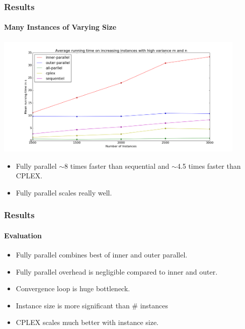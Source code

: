 \documentclass{beamer}
\begin{document}
\begin{frame}[fragile]
\frametitle{Results}
\framesubtitle{Many Instances of Varying Size}
\centering
\includegraphics[width=0.9\textwidth]{../Doc/figures/many-varying}
\begin{itemize}
	\item Fully parallel $\sim$8 times faster than sequential and $\sim$4.5 times faster than CPLEX.
	\item Fully parallel scales really well.
\end{itemize}
\end{frame}

\begin{frame}
\frametitle{Results}
\framesubtitle{Evaluation}
\begin{itemize}
\item Fully parallel combines best of inner and outer parallel.
\pause
\item Fully parallel overhead is negligible compared to inner and outer.
\pause
\item Convergence loop is huge bottleneck.
\pause
\item Instance size is more significant than \# instances
\pause
\item CPLEX scales much better with instance size.
\end{itemize}
\end{frame}
\end{document}
